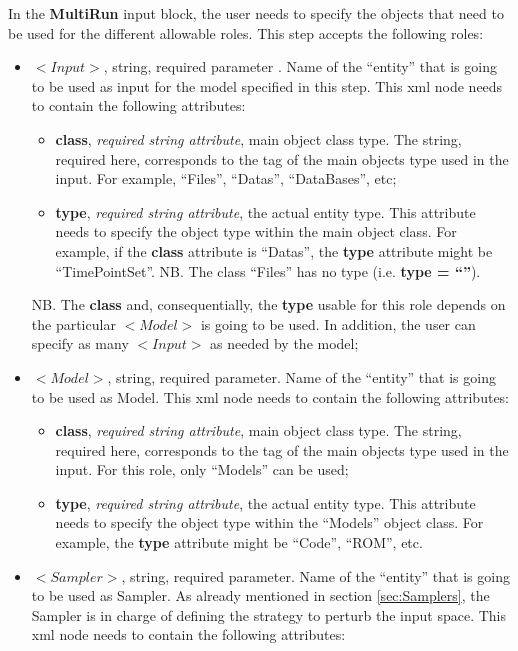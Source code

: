 \vspace{-5mm}
In the \textbf{MultiRun} input block, the user needs to specify the objects that need to be used for the different allowable roles. This step accepts the following roles:
\begin{itemize}
\item $<Input>$, string, required parameter . Name of the ``entity'' that is going to be used as input for the model specified in this step. This xml node needs to contain the following attributes:
\begin{itemize}
  \item \textbf{class}, \textit{required string attribute}, main object class type. The string, required here, corresponds to the tag of the main objects type used in the input. For example, ``Files'', ``Datas'', ``DataBases'', etc;
  \item \textbf{type}, \textit{required string attribute}, the actual entity type. This attribute needs to specify the object type within the main object class. For example, if the  \textbf{class} attribute is ``Datas'', the \textbf{type} attribute might be ``TimePointSet''. NB. The class ``Files'' has no type (i.e. \textbf{type = ``''}).
\end{itemize}
NB. The \textbf{class} and, consequentially,  the \textbf{type} usable for this role depends on the particular $<Model>$ is going to be used. In addition, the user can specify as many $<Input>$ as needed by the model;
\item $<Model>$, string, required parameter. Name of the ``entity'' that is going to be used as Model. This xml node needs to contain the following attributes:
\begin{itemize}
  \item \textbf{class}, \textit{required string attribute}, main object class type. The string, required here, corresponds to the tag of the main objects type used in the input. For this role, only ``Models'' can be used;
  \item \textbf{type}, \textit{required string attribute}, the actual entity type. This attribute needs to specify the object type within the ``Models'' object class. For example, the \textbf{type} attribute might be ``Code'', ``ROM'', etc.
\end{itemize}
\item $<Sampler>$, string, required parameter. Name of the ``entity'' that is going to be used as Sampler. As already mentioned in section \ref{sec:Samplers}, the Sampler is in charge of defining the strategy to perturb the input space. This xml node needs to contain the following attributes:

\end{itemize}
